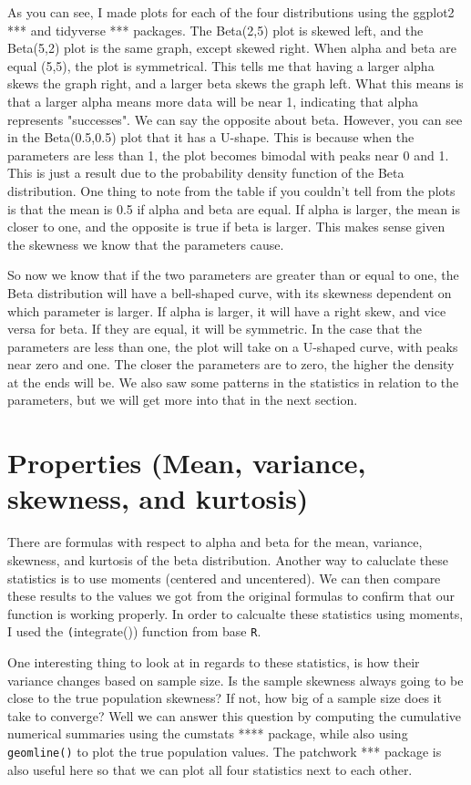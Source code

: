 \documentclass{article}\usepackage[]{graphicx}\usepackage[]{xcolor}
\begin{document}
\begin{multicols}{2}
As you can see, I made plots for each of the four distributions using the ggplot2 *** and tidyverse *** packages. The Beta(2,5) plot is skewed left, and the Beta(5,2) plot is the same graph, except skewed right. When alpha and beta are equal (5,5), the plot is symmetrical. This tells me that having a larger alpha skews the graph right, and a larger beta skews the graph left. What this means is that a larger alpha means more data will be near 1, indicating that alpha represents "successes". We can say the opposite about beta. However, you can see in the Beta(0.5,0.5) plot that it has a U-shape. This is because when the parameters are less than 1, the plot becomes bimodal with peaks near 0 and 1. This is just a result due to the probability density function of the Beta distribution. One thing to note from the table if you couldn't tell from the plots is that the mean is 0.5 if alpha and beta are equal. If alpha is larger, the mean is closer to one, and the opposite is true if beta is larger. This makes sense given the skewness we know that the parameters cause.

So now we know that if the two parameters are greater than or equal to one, the Beta distribution will have a bell-shaped curve, with its skewness dependent on which parameter is larger. If alpha is larger, it will have a right skew, and vice versa for beta. If they are equal, it will be symmetric. In the case that the parameters are less than one, the plot will take on a U-shaped curve, with peaks near zero and one. The closer the parameters are to zero, the higher the density at the ends will be. We also saw some patterns in the statistics in relation to the parameters, but we will get more into that in the next section.

\section{Properties (Mean, variance, skewness, and kurtosis)}
There are formulas with respect to alpha and beta for the mean, variance, skewness, and kurtosis of the beta distribution. Another way to caluclate these statistics is to use moments (centered and uncentered). We can then compare these results to the values we got from the original formulas to confirm that our function is working properly. In order to calcualte these statistics using moments, I used the \texttt(integrate()) function from base \texttt{R}.

One interesting thing to look at in regards to these statistics, is how their variance changes based on sample size. Is the sample skewness always going to be close to the true population skewness? If not, how big of a sample size does it take to converge? Well we can answer this question by computing the cumulative numerical summaries using the cumstats **** package, while also using \texttt{geom\textunderscore line()} to plot the true population values. The patchwork *** package is also useful here so that we can plot all four statistics next to each other.


\end{multicols}
\end{document}
